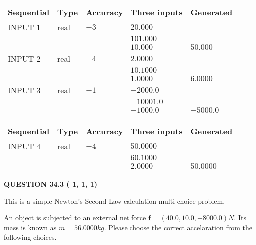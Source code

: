 \documentclass[12pt]{article}
\begin{document}
   
  
  
\noindent\begin{tabular}{|l|l|l|l|l|}
\hline
 Sequential & Type & Accuracy & Three inputs & Generated \\ 
\hline
 
 
  INPUT $           1$ & real & $          -3 $ & $
 20.000
  $ & \\
  & & &  $
 101.000
  $ & \\
  & & &  $
 10.000
 $ & $ 50.000 $ 
 \\  \hline  
 
 
  INPUT $           2$ & real & $          -4 $ & $
 2.0000
  $ & \\
  & & &  $
 10.1000
  $ & \\
  & & &  $
 1.0000
 $ & $ 6.0000 $ 
 \\  \hline  
 
 
  INPUT $           3$ & real & $          -1 $ & $
 -2000.0
  $ & \\
  & & &  $
 -10001.0
  $ & \\
  & & &  $
 -1000.0
 $ & $ -5000.0 $ 
 \\  \hline  
 \end{tabular}
   
   
  
  
\noindent\begin{tabular}{|l|l|l|l|l|}
\hline
 Sequential & Type & Accuracy & Three inputs & Generated \\ 
\hline
 
 
  INPUT $           4$ & real & $          -4 $ & $
 50.0000
  $ & \\
  & & &  $
 60.1000
  $ & \\
  & & &  $
 2.0000
 $ & $ 50.0000 $ 
 \\  \hline  
 \end{tabular}
   
   
  
\vspace{0.2in}
  
{\textbf{\Large{QUESTION
34.3 
 (          1,          1,          1)
}}}
  
  


\noindent{}
This is a simple Newton's Second Law calculation multi-choice problem.  
\noindent{}


 
 
An object is subjected to an external net force $\mathbf{f}=
(40.0 , 10.0 , -8000.0) N$.
Its mass is known as $m= %
56.0000 kg$. Please choose the
correct accelaration from the following choices.
 
\end{document}
